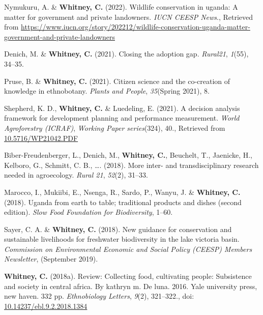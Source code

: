 \documentclass[11pt,a4paper,]{awesome-cv}
\newlength{\cslhangindent}
\newenvironment{CSLReferences}[2] %
 {\begin{list}{}{%
  \setlength{\itemindent}{0pt}
  \setlength{\leftmargin}{0pt}
  \setlength{\parsep}{0pt}
  \ifodd #1
   \setlength{\leftmargin}{\cslhangindent}
   \setlength{\itemindent}{-1\cslhangindent}
  \fi
  \setlength{\itemsep}{#2\baselineskip}}}
 {\end{list}}
\begin{document}
\label{refs-a322b38e0d5e6b1d8b6b209c35f45b75}
\begin{CSLReferences}{1}{0}
Nymukuru, A. \& \textbf{Whitney, C.} (2022). Wildlife conservation in
uganda: A matter for government and private landowners. \emph{IUCN CEESP
News}., Retrieved from
\url{https://www.iucn.org/story/202212/wildlife-conservation-uganda-matter-government-and-private-landowners}

Denich, M. \& \textbf{Whitney, C.} (2021). Closing the adoption gap.
\emph{Rural21}, \emph{1}(55), 34--35.

Pruse, B. \& \textbf{Whitney, C.} (2021). Citizen science and the
co-creation of knowledge in ethnobotany. \emph{Plants and People},
\emph{35}(Spring 2021), 8.

Shepherd, K. D., \textbf{Whitney, C.} \& Luedeling, E. (2021). A
decision analysis framework for development planning and performance
measurement. \emph{World Agroforestry (ICRAF)}, \emph{Working Paper
series}(324), 40., Retrieved from
\href{https://10.5716/WP21042.PDF}{10.5716/WP21042.PDF}

Biber-Freudenberger, L., Denich, M., \textbf{Whitney, C.}, Beuchelt, T.,
Jaenicke, H., Kelboro, G., Schmitt, C. B., \ldots{}. (2018). More inter-
and transdisciplinary research needed in agroecology. \emph{Rural 21},
\emph{52}(2), 31--33.

Marocco, I., Mukiibi, E., Nsenga, R., Sardo, P., Wanyu, J. \&
\textbf{Whitney, C.} (2018). Uganda from earth to table; traditional
products and dishes (second edition). \emph{Slow Food Foundation for
Biodiversity}, 1--60.

Sayer, C. A. \& \textbf{Whitney, C.} (2018). New guidance for
conservation and sustainable livelihoods for freshwater biodiversity in
the lake victoria basin. \emph{Commission on Environmental Economic and
Social Policy (CEESP) Members Newsletter}, (September 2019).

\textbf{Whitney, C.} (2018a). Review: Collecting food, cultivating
people: Subsistence and society in central africa. By kathryn m. De
luna. 2016. Yale university press, new haven. 332 pp. \emph{Ethnobiology
Letters}, \emph{9}(2), 321--322., doi:
\href{https://doi.org/10.14237/ebl.9.2.2018.1384}{10.14237/ebl.9.2.2018.1384}


\end{CSLReferences}
\end{document}
